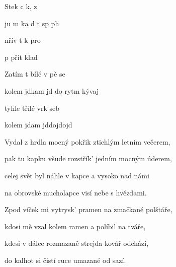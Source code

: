 

\zs
Stek  c k,  z  

ju m ka d t sp ph

nřív   t k pro

p přit klad
\ks

\zr
Zatím t bílé v pě se

kolem jdkam jd do rytm kývaj

tyhle třílé vrk seb

kolem jdam jddojdojd
\kr

\zs
Vydal z hrdla mocný pokřik ztichlým letním večerem,

pak tu kapku všude rozstřík' jedním mocným úderem,

celej svět byl náhle v kapce a vysoko nad námi

na obrovské mucholapce visí nebe s hvězdami.
\ks

\zr \kr

\zs
Zpod víček mi vytrysk' pramen na zmačkané polštáře,

kdosi mě vzal kolem ramen a políbil na tváře,

kdesi v dálce rozmazaně strejda kovář odchází,

do kalhot si čistí ruce umazané od sazí.
\ks
{}              


\kp






